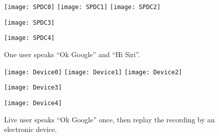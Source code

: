 \newpage
\begin{figure}[H]
	\centering
	\begin{minipage}[t]{.8\linewidth}
		\centering
		\texttt{[image: SPDC0]}
		\vspace{-.2in}
		\vspace{.2in}
		\texttt{[image: SPDC1]}
		\texttt{[image: SPDC2]}
		\vspace{-.2in}
		\vspace{.2in}
	\end{minipage}
	\begin{minipage}[t]{.45\linewidth}
		\centering
		\texttt{[image: SPDC3]}
		\vspace{-.2in}
	\end{minipage}
	\begin{minipage}[t]{.45\linewidth}
		\centering
		\texttt{[image: SPDC4]}
		\vspace{-.2in}
	\end{minipage}
	\caption{One user speaks ``Ok Google'' and ``Hi Siri''.}
	\label{fig:SPDC}
\end{figure}
\newpage
\begin{figure}[H]
	\centering
	\begin{minipage}[t]{.8\linewidth}
		\centering
		\texttt{[image: Device0]}
		\vspace{-.2in}
		\vspace{.2in}
		\texttt{[image: Device1]}
		\texttt{[image: Device2]}
		\vspace{-.2in}
		\vspace{.2in}
	\end{minipage}
	\begin{minipage}[t]{.45\linewidth}
		\centering
		\texttt{[image: Device3]}
		\vspace{-.2in}
	\end{minipage}
	\begin{minipage}[t]{.45\linewidth}
		\centering
		\texttt{[image: Device4]}
		\vspace{-.2in}
		\label{fig:deviced}
	\end{minipage}
	\caption{Live user speaks ``Ok Google'' once, then replay the recording by an electronic device.}
	\label{fig:device}
\end{figure}
\newpage



